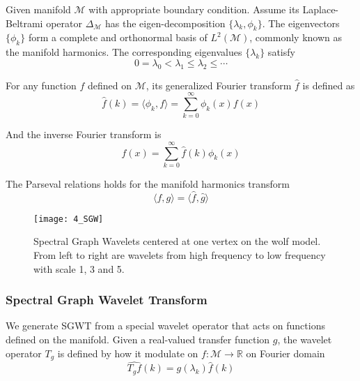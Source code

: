 Given manifold $\mathcal{M}$ with appropriate boundary condition. Assume its Laplace-Beltrami operator $\Delta_\mathcal{M}$ has the eigen-decomposition $\{\lambda_k,\phi_k\}$. The eigenvectors $\{\phi_k\}$ form a complete and orthonormal basis of $L^2(\mathcal{M})$, commonly known as the manifold harmonics. The corresponding eigenvalues $\{\lambda_k\}$ satisfy
\begin{equation}
0=\lambda_0 < \lambda_1 \leq \lambda_2 \leq \cdots
\end{equation}

For any function $f$ defined on $\mathcal{M}$, its generalized Fourier transform $\hat{f}$ is defined as
\begin{equation}
\hat{f}(k)=\langle \phi_k, f \rangle=\sum_{k=0}^\infty \phi_k(x)f(x)
\end{equation}

And the inverse Fourier transform is
\begin{equation}
f(x)=\sum_{k=0}^\infty\hat{f}(k)\phi_k(x)
\end{equation}

The Parseval relations holds for the manifold harmonics transform
\begin{equation}
\label{eq:parseval}
\langle f,g\rangle=\langle\hat{f},\hat{g}\rangle
\end{equation}

\begin{figure}[!to]
\begin{center}
\texttt{[image: 4\_SGW]}
\end{center}
\caption[Spectral graph wavelets on the wolf model.]{Spectral Graph Wavelets centered at one vertex on the wolf model.
  From left to right are wavelets from high frequency to low frequency with
  scale 1, 3 and 5.}
\label{SGW}
\end{figure}

\subsubsection{Spectral Graph Wavelet Transform}

We generate SGWT from a special wavelet operator that acts on functions defined on the manifold. Given a real-valued transfer function $g$, the wavelet operator $T_g$ is defined by how it modulate on $f:\mathcal{M}\to\mathbb{R}$ on Fourier domain
\begin{equation}
\widehat{T_g f}(k)=g(\lambda_k)\hat{f}(k)
\end{equation}

